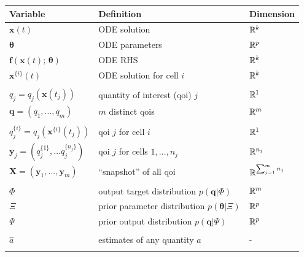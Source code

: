 \begin{table}[htbp]
\centering
\begin{adjustwidth}{0in}{0in}%
\begin{tabularx}{1.1\textwidth}{lll}
Variable	                                                & Definition                                   & Dimension \\
\toprule
$\boldsymbol{x}(t)$                                     	& ODE solution                                 & $\mathbb{R}^k$ \\
$\boldsymbol{\theta}$                                     	& ODE parameters                               & $\mathbb{R}^p$ \\
$\boldsymbol{f}(\boldsymbol{x}(t); \, \boldsymbol{\theta})$	& ODE RHS                                      & $\mathbb{R}^k$ \\
$\boldsymbol{x}^{\{i\}}(t)$                                 & ODE solution for cell $i$                    & $\mathbb{R}^k$ \\
&&\\
$q_j= q_j(\boldsymbol{x}(t_j))$                             & quantity of interest (qoi) $j$               & $\mathbb{R}^1$ \\
$\boldsymbol{q}= \left( q_1, \dots, q_m \right)$            & $m$ distinct qois                            & $\mathbb{R}^m$ \\
&&\\
$q_j^{\{i\}}= q_j(\boldsymbol{x}^{\{i\}}(t_j))$             & qoi $j$ for cell $i$                         & $\mathbb{R}^1$ \\
$\boldsymbol{y}_j=\left( q_j^{\{1\}}, \dots q_j^{\{n_j\}} \right)$  & qoi $j$ for cells $1, \dots, n_j$    & $\mathbb{R}^{n_j}$ \\
$\boldsymbol{X}=(\boldsymbol{y}_1,...,\boldsymbol{y}_m)$    & ``snapshot'' of all qoi                      & $\mathbb{R}^{\sum_{j=1}^m n_j}$ \\
&&\\
$\Phi$ & output target distribution $p(\boldsymbol{q}|\Phi)$              & $\mathbb{R}^m$ \\
$\Xi$  & prior parameter distribution $p(\boldsymbol{\theta}|\Xi)$        & $\mathbb{R}^p$ \\
$\Psi$ & prior output distribution $p(\boldsymbol{q}|\Psi)$               & $\mathbb{R}^p$ \\
&&\\
$\hat{a}$ & estimates of any quantity $a$                                                                  & - \\
&&\\

\end{tabularx}
\end{adjustwidth}
\end{table}
